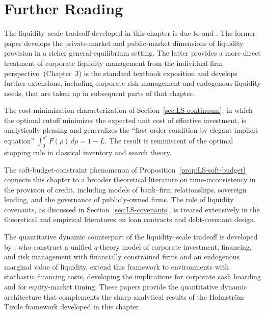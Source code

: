 \documentclass[11pt,a4paper,oneside]{book}
\theoremstyle{plain}
\theoremstyle{definition}
\theoremstyle{remark}
\numberwithin{equation}{chapter}
\begin{document}
\section{Further Reading}
\label{sec:LS-further-reading}

The liquidity--scale tradeoff developed in this chapter is due to \citet{HolmstromTirole1998} and \citet{HolmstromTirole2000}.
The former paper develops the private-market and public-market dimensions of liquidity provision in a richer general-equilibrium setting.
The latter provides a more direct treatment of corporate liquidity management from the individual-firm perspective.
\citet{Tirole2006} (Chapter~3) is the standard textbook exposition and develops further extensions, including corporate risk management and endogenous liquidity needs, that are taken up in subsequent parts of that chapter.

The cost-minimization characterization of Section~\ref{sec:LS-continuum}, in which the optimal cutoff minimizes the expected unit cost of effective investment, is analytically pleasing and generalizes the ``first-order condition by elegant implicit equation'' $\int_0^{\rho^\star} F(\rho) \, d\rho = 1 - L$.
The result is reminiscent of the optimal stopping rule in classical inventory and search theory.

The soft-budget-constraint phenomenon of Proposition~\ref{prop:LS-soft-budget} connects this chapter to a broader theoretical literature on time-inconsistency in the provision of credit, including models of bank--firm relationships, sovereign lending, and the governance of publicly-owned firms.
The role of liquidity covenants, as discussed in Section~\ref{sec:LS-covenants}, is treated extensively in the theoretical and empirical literatures on loan contracts and debt-covenant design.

The quantitative dynamic counterpart of the liquidity--scale tradeoff is developed by \citet{BoltonChenWang2011}, who construct a unified $q$-theory model of corporate investment, financing, and risk management with financially constrained firms and an endogenous marginal value of liquidity.
\citet{BoltonChenWang2013} extend this framework to environments with stochastic financing costs, developing the implications for corporate cash hoarding and for equity-market timing.
These papers provide the quantitative dynamic architecture that complements the sharp analytical results of the Holmstr\"om--Tirole framework developed in this chapter.
\end{document}

